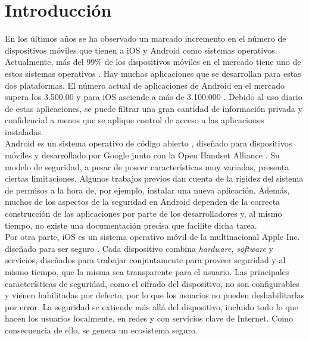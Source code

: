 \chapter{Introducción}
En los últimos años se ha observado un marcado incremento en el número de dispositivos móviles
que tienen a iOS y Android como sistemas operativos. Actualmente, más del 99\% de los dispositivos móviles en el mercado tiene uno de estos sistemas operativos \cite{wss}. Hay muchas aplicaciones que se desarrollan para estas dos plataformas. El número actual de aplicaciones de Android en el mercado supera los 3.500.00 \cite{GPS} y para iOS asciende a más de 3.100.000 \cite{ASM}. Debido al uso diario de estas aplicaciones, se puede filtrar una gran cantidad de información privada y confidencial a menos que se aplique control de acceso a las aplicaciones instaladas.\\

Android \cite{aos} es un sistema operativo de código abierto \cite{aosp}, diseñado para dispositivos móviles y desarrollado por Google junto con la Open Handset Alliance \cite{oha}. Su modelo de seguridad, a pesar de poseer características muy variadas, presenta ciertas limitaciones. Algunos trabajos previos dan cuenta de la rigidez del sistema de permisos a la hora de, por ejemplo, instalar una nueva aplicación. Además, muchos de los aspectos de la seguridad en Android dependen de la correcta construcción de las aplicaciones por parte de los desarrolladores y, al mismo tiempo, no existe una documentación precisa que facilite dicha tarea.\\

Por otra parte, iOS es un sistema operativo móvil de la multinacional Apple Inc. diseñado para ser seguro \cite{asg}. Cada dispositivo combina \emph{hardware}, \emph{software} y servicios, diseñados para trabajar conjuntamente para proveer seguridad y al mismo tiempo, que la misma sea transparente para el usuario. Las principales características de seguridad, como el cifrado del dispositivo, no son configurables y vienen habilitadas por defecto, por lo que los usuarios no pueden deshabilitarlas por error. La seguridad se extiende más allá del dispositivo, incluido todo lo que hacen los usuarios localmente, en redes y con servicios clave de Internet. Como consecuencia de ello, se genera un ecosistema seguro.\\

